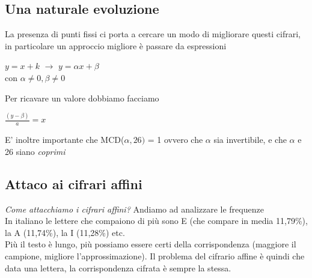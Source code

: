\documentclass[11pt, oneside]{article}   	%
\begin{document}
\subsection*{Una naturale evoluzione}
La presenza di punti fissi ci porta a cercare un modo di migliorare questi cifrari, in particolare un approccio migliore è passare da espressioni 
\begin{center}
\(y = x + k \) $\rightarrow$ \(y = \alpha x + \beta \) \\
con \(\alpha \neq 0   , \beta \neq 0 \)
\end{center}
Per ricavare un valore dobbiamo facciamo 
\begin{center}$\frac{(y-\beta)}{a} = x$ 
\end{center}
E' inoltre importante che MCD($\alpha, 26)$ = 1 ovvero che $\alpha$ sia invertibile, e che $\alpha$ e 26 siano \emph{coprimi}

\subsection*{Attaco ai cifrari affini}
\emph{Come attacchiamo i cifrari affini?} Andiamo ad analizzare le frequenze\\
In italiano le lettere che compaiono di più sono E (che compare in media 11,79\%), la A (11,74\%), la I (11,28\%) etc.\\ Più il testo è lungo, più possiamo essere certi della corrispondenza (maggiore il campione, migliore l'approssimazione). Il problema del cifrario affine è quindi che data una lettera, la corrispondenza cifrata è sempre la stessa.
\end{document}
